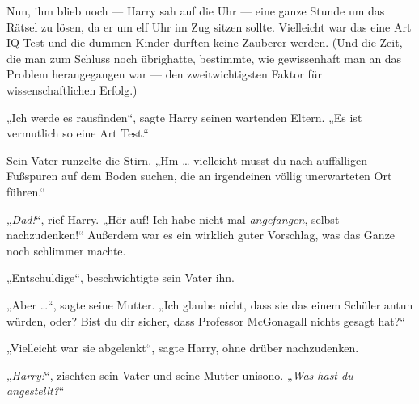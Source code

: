 Nun, ihm blieb noch — Harry sah auf die Uhr — eine ganze Stunde um das Rätsel zu lösen, da er um elf Uhr im Zug sitzen sollte. Vielleicht war das eine Art IQ-Test und die dummen Kinder durften keine Zauberer werden. (Und die Zeit, die man zum Schluss noch übrighatte, bestimmte, wie gewissenhaft man an das Problem herangegangen war — den zweitwichtigsten Faktor für wissenschaftlichen Erfolg.)

„Ich werde es rausfinden“, sagte Harry seinen wartenden Eltern.
„Es ist vermutlich so eine Art Test.“

Sein Vater runzelte die Stirn.
„Hm … vielleicht musst du nach auffälligen Fußspuren auf dem Boden suchen, die an irgendeinen völlig unerwarteten Ort führen.“

„\emph{Dad!}“, rief Harry.
„Hör auf! Ich habe nicht mal \emph{angefangen}, selbst nachzudenken!“ Außerdem war es ein wirklich guter Vorschlag, was das Ganze noch schlimmer machte.

„Entschuldige“, beschwichtigte sein Vater ihn.

„Aber …“, sagte seine Mutter.
„Ich glaube nicht, dass sie das einem Schüler antun würden, oder? Bist du dir sicher, dass Professor McGonagall nichts gesagt hat?“

„Vielleicht war sie abgelenkt“, sagte Harry, ohne drüber nachzudenken.

„\emph{Harry!}“, zischten sein Vater und seine Mutter unisono.
„\emph{Was hast du angestellt?}“


